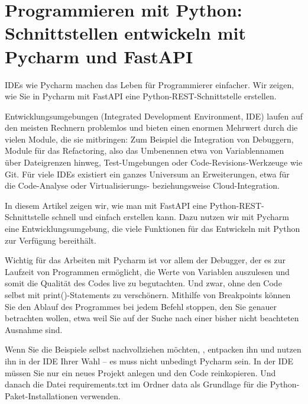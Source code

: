 %
%
%



\chapter{Programmieren mit Python: Schnittstellen entwickeln mit Pycharm und FastAPI}

IDEs wie Pycharm machen das Leben für Programmierer einfacher. Wir zeigen, wie Sie in Pycharm mit FastAPI eine Python-REST-Schnittstelle erstellen.

Entwicklungsumgebungen (Integrated Development Environment, IDE) laufen auf den meisten Rechnern problemlos und bieten einen enormen Mehrwert durch die vielen Module, die sie mitbringen: Zum Beispiel die Integration von Debuggern, Module für das Refactoring, also das Umbenennen etwa von Variablennamen über Dateigrenzen hinweg, Test-Umgebungen oder Code-Revisions-Werkzeuge wie Git. Für viele IDEs existiert ein ganzes Universum an Erweiterungen, etwa für die Code-Analyse oder Virtualisierungs- beziehungsweise Cloud-Integration.

In diesem Artikel zeigen wir, wie man mit FastAPI eine Python-REST-Schnittstelle schnell und einfach erstellen kann. Dazu nutzen wir mit Pycharm eine Entwicklungsumgebung, die viele Funktionen für das Entwickeln mit Python zur Verfügung bereithält.

Wichtig für das Arbeiten mit Pycharm ist vor allem der Debugger, der es zur Laufzeit von Programmen ermöglicht, die Werte von Variablen auszulesen und somit die Qualität des Codes live zu begutachten. Und zwar, ohne den Code selbst mit print()-Statements zu verschönern. Mithilfe von Breakpoints können Sie den Ablauf des Programmes bei jedem Befehl stoppen, den Sie genauer betrachten wollen, etwa weil Sie auf der Suche nach einer bisher nicht beachteten Ausnahme sind.

Wenn Sie die Beispiele selbst nachvollziehen möchten, , entpacken ihn und nutzen ihn in der IDE Ihrer Wahl -- es muss nicht unbedingt Pycharm sein. In der IDE müssen Sie nur ein neues Projekt anlegen und den Code reinkopieren. Und danach die Datei requirements.txt im Ordner data als Grundlage für die Python-Paket-Installationen verwenden.

